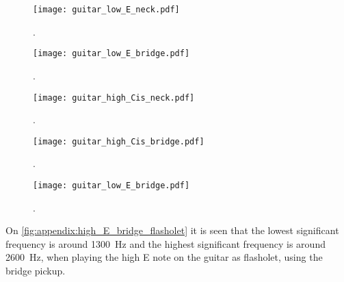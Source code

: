 \begin{figure}[h]
	\centering
		\texttt{[image: guitar\_low\_E\_neck.pdf]}
		\caption{.}
		\label{fig:appendix:low_E_neck}
\end{figure}

\begin{figure}[h]
	\centering
		\texttt{[image: guitar\_low\_E\_bridge.pdf]}
		\caption{.}
		\label{fig:appendix:low_E_bridge}
\end{figure}

\begin{figure}[h]
	\centering
		\texttt{[image: guitar\_high\_Cis\_neck.pdf]}
		\caption{.}
		\label{fig:appendix:low_high_Cis_neck}
\end{figure}

\begin{figure}[h]
	\centering
		\texttt{[image: guitar\_high\_Cis\_bridge.pdf]}
		\caption{.}
		\label{fig:appendix:low_high_Cis_bridge}
\end{figure}

\begin{figure}[h]
	\centering
		\texttt{[image: guitar\_low\_E\_bridge.pdf]}
		\caption{.}
		\label{fig:appendix:higfh_E_bridge_flasholet}
\end{figure}

On  \autoref{fig:appendix:high_E_bridge_flasholet} it is seen that the lowest significant frequency is around \SI{1300}{\hertz} and the highest significant frequency is around \SI{2600}{\hertz}, when playing the high E note on the guitar as flasholet, using the bridge pickup. 
